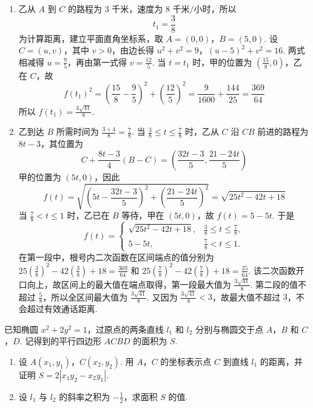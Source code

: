 \begin{solution}
\begin{enumerate}
\item 乙从 \(A\) 到 \(C\) 的路程为 \(3\text{ 千米}\)，速度为 \(8\text{ 千米/小时}\)，所以
\[
t_1=\frac38
\]
为计算距离，建立平面直角坐标系，取 \(A=(0,0)\)，\(B=(5,0)\). 设 \(C=(u,v)\)，其中 \(v>0\)，由边长得
\(u^2+v^2=9\)，\((u-5)^2+v^2=16\).
两式相减得 \(u=\frac95\)，再由第一式得 \(v=\frac{12}{5}\). 当 \(t=t_1\) 时，甲的位置为 \(\left(\frac{15}{8},0\right)\)，乙在 \(C\)，故
\[
f(t_1)^2=\left(\frac{15}{8}-\frac95\right)^2+\left(\frac{12}{5}\right)^2=\frac{9}{1600}+\frac{144}{25}=\frac{369}{64}
\]
所以 \(f(t_1)=\frac{3\sqrt{41}}8\).

\item 乙到达 \(B\) 所需时间为 \(\frac{3+4}{8}=\frac78\). 当 \(\frac38\leqslant t\leqslant\frac78\) 时，乙从 \(C\) 沿 \(CB\) 前进的路程为 \(8t-3\)，其位置为
\[
C+\frac{8t-3}{4}(B-C)=\left(\frac{32t-3}{5},\frac{21-24t}{5}\right)
\]
甲的位置为 \((5t,0)\)，因此
\[
f(t)=\sqrt{\left(5t-\frac{32t-3}{5}\right)^2+\left(\frac{21-24t}{5}\right)^2}=\sqrt{25t^2-42t+18}
\]
当 \(\frac78<t\leqslant1\) 时，乙已在 \(B\) 等待，甲在 \((5t,0)\)，故 \(f(t)=5-5t\). 于是
\[
f(t)=\begin{cases}
\sqrt{25t^2-42t+18},&\frac38\leqslant t\leqslant\frac78,\\
5-5t,&\frac78<t\leqslant1.
\end{cases}
\]
在第一段中，根号内二次函数在区间端点的值分别为 \(25\left(\frac38\right)^2-42\left(\frac38\right)+18=\frac{369}{64}\) 和 \(25\left(\frac78\right)^2-42\left(\frac78\right)+18=\frac{25}{64}\).
该二次函数开口向上，故区间上的最大值在端点取得，第一段最大值为 \(\frac{3\sqrt{41}}8\). 第二段的值不超过 \(\frac58\)，所以全区间最大值为 \(\frac{3\sqrt{41}}8\). 又因为 \(\frac{3\sqrt{41}}8<3\)，故最大值不超过 \(3\)，不会超过有效通话距离.
\end{enumerate}
\end{solution}

\begin{problem}
已知椭圆 \(x^{2} + 2y^{2} = 1\)，过原点的两条直线 \(l_{1}\) 和 \(l_{2}\) 分别与椭圆交于点 \(A\)，\(B\) 和 \(C\)，\(D\). 记得到的平行四边形 \(ACBD\) 的面积为 \(S\).
\begin{enumerate}
\item 设 \(A(x_{1}, y_{1})\)，\(C(x_{2}, y_{2})\). 用 \(A\)，\(C\) 的坐标表示点 \(C\) 到直线 \(l_{1}\) 的距离，并证明 \(S = 2|x_{1}y_{2} - x_{2}y_{1}|\).
\item 设 \(l_{1}\) 与 \(l_{2}\) 的斜率之积为 \(-\frac{1}{2}\)，求面积 \(S\) 的值.
\end{enumerate}
\end{problem}

